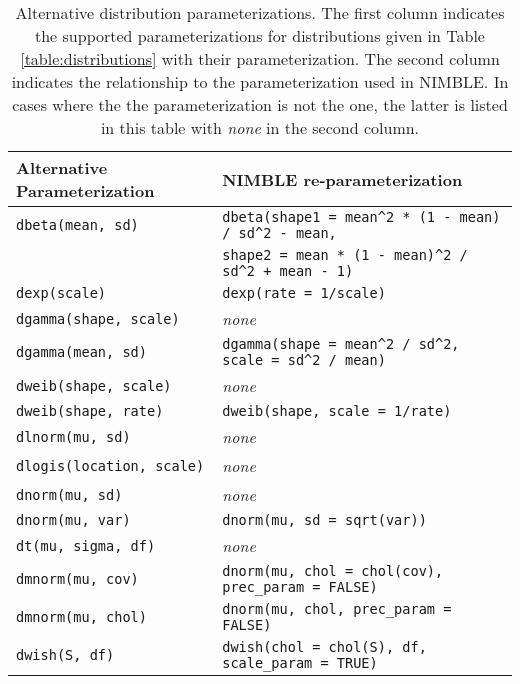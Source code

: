 \begin{table}[!h]
  \begin{center}
    \begin{tabular}{ll}
      \hline
      Alternative Parameterization & NIMBLE re-parameterization \\
      \hline
      \texttt{dbeta(mean, sd)} & \verb|dbeta(shape1 = mean^2 * (1 - mean) / sd^2 - mean,| \\
      & \verb|shape2 = mean * (1 - mean)^2 / sd^2 + mean - 1)| \\
      \texttt{dexp(scale)} & \texttt{dexp(rate = 1/scale)} \\
     \texttt{dgamma(shape, scale)} & \textit{none} \\
      \texttt{dgamma(mean, sd)} & \verb|dgamma(shape = mean^2 / sd^2, scale = sd^2 / mean)| \\
     \texttt{dweib(shape, scale)} & \textit{none} \\
     \texttt{dweib(shape, rate)} & \texttt{dweib(shape, scale = 1/rate)} \\
     \texttt{dlnorm(mu, sd)} & \textit{none} \\
     \texttt{dlogis(location, scale)} & \textit{none} \\
     \texttt{dnorm(mu, sd)} & \textit{none} \\
     \texttt{dnorm(mu, var)} & \texttt{dnorm(mu, sd = sqrt(var))} \\
     \texttt{dt(mu, sigma, df)} & \textit{none} \\
     \texttt{dmnorm(mu, cov)} & \texttt{dnorm(mu, chol = chol(cov), prec\_param = FALSE)} \\
     \texttt{dmnorm(mu, chol)} & \texttt{dnorm(mu, chol, prec\_param = FALSE)} \\
     \texttt{dwish(S, df)} & \texttt{dwish(chol = chol(S), df, scale\_param = TRUE)}\\ 
     \end{tabular}
  \caption{Alternative distribution parameterizations. The first
    column indicates the supported parameterizations for
    distributions given in Table \ref{table:distributions} with their
     parameterization. The second column indicates the
    relationship to the  parameterization used in
    NIMBLE. In cases where the the  parameterization is not
    the  one, the latter is listed in this table with
    \textit{none} in the second column.}
    \label{table:distributions-alternates}
  \end{center}
\end{table}
